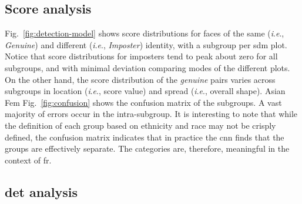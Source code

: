 \documentclass[10pt,twocolumn,letterpaper]{article}
\newcommand{\ie}{\textit{i}.\textit{e}., }
\begin{document}

\subsection{Score analysis}
Fig.~\ref{fig:detection-model} shows score distributions for faces of the same (\ie \emph{Genuine}) and different (\ie \emph{Imposter}) identity, with a subgroup per \gls{sdm} plot. Notice that score distributions for imposters tend to peak about zero for all subgroups, and with minimal deviation comparing modes of the different plots. On the other hand, the score distribution of the \emph{genuine} pairs varies across subgroups in location (\ie score value) and spread (\ie overall shape). Asian Fem
Fig.~\ref{fig:confusion} shows the confusion matrix of the subgroups. A vast majority of errors occur in the intra-subgroup. It is interesting to note that while the definition of  each group  based on ethnicity and race may not be crisply defined, the confusion matrix indicates that in practice the \gls{cnn} finds that the groups are effectively separate. The categories are, therefore, meaningful in the context of \gls{fr}.


\subsection{\gls{det} analysis}
\end{document}
